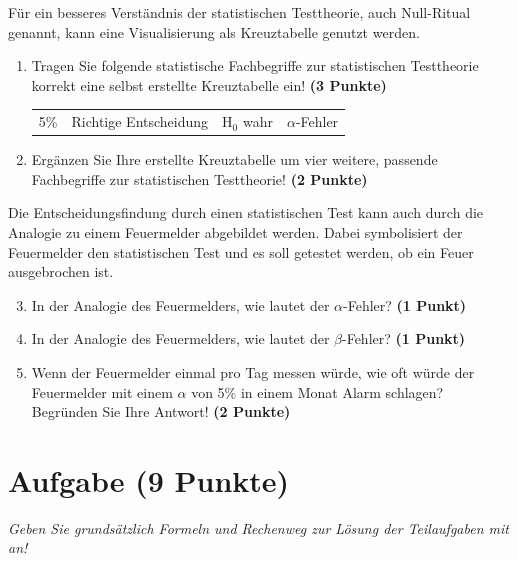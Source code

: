 \documentclass[a4paper, 9pt]{scrartcl}\usepackage[]{graphicx}\usepackage[]{xcolor}
\begin{document}
F{\"u}r ein besseres Verst{\"a}ndnis der statistischen Testtheorie, auch
Null-Ritual genannt, kann eine Visualisierung als Kreuztabelle genutzt werden.  

\begin{enumerate}
\item Tragen Sie folgende statistische Fachbegriffe zur statistischen
  Testtheorie korrekt eine selbst erstellte Kreuztabelle ein! \textbf{(3
    Punkte)}
  \begin{center}
  \begin{tabular}{cccc}
  5\% & Richtige Entscheidung & H$_0$ wahr & $\alpha$-Fehler \\
  \end{tabular}
  \end{center}
\item Erg{\"a}nzen Sie Ihre erstellte Kreuztabelle um vier weitere, passende
  Fachbegriffe zur statistischen Testtheorie! \textbf{(2 Punkte)}
\end{enumerate}

Die Entscheidungsfindung durch einen statistischen Test kann auch durch die
Analogie zu einem Feuermelder abgebildet werden. Dabei symbolisiert der
Feuermelder den statistischen Test und es soll getestet werden, ob ein Feuer
ausgebrochen ist.

\begin{enumerate}
  \setcounter{enumi}{2}    
\item In der Analogie des Feuermelders, wie lautet der $\alpha$-Fehler? \textbf{(1 Punkt)}
\item In der Analogie des Feuermelders, wie lautet der $\beta$-Fehler? \textbf{(1 Punkt)}
\item Wenn der Feuermelder einmal pro Tag messen w{\"u}rde, wie oft w{\"u}rde der
  Feuermelder mit einem $\alpha$ von 5\% in einem Monat Alarm schlagen?
  Begr{\"u}nden Sie Ihre Antwort! \textbf{(2 Punkte)}
\end{enumerate}



 
\clearpage

\section{Aufgabe \hfill (9 Punkte)}

\textit{Geben Sie grunds{\"a}tzlich Formeln und Rechenweg zur L{\"o}sung der
  Teilaufgaben mit an!} \\[1Ex]
\end{document}
